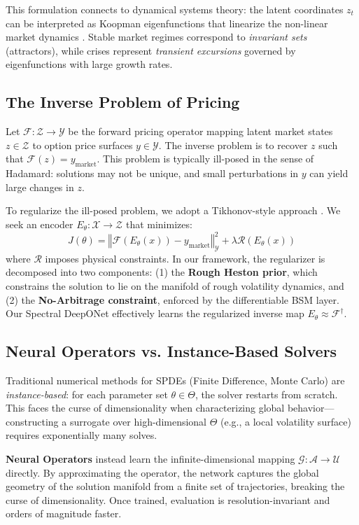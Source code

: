 \documentclass{article}
\newcommand\norm[1]{\left\Vert #1 \right\Vert}
\begin{document}
This formulation connects to dynamical systems theory: the latent coordinates \(z_t\) can be interpreted as Koopman eigenfunctions that linearize the non-linear market dynamics \citep{brunton2021modern}. Stable market regimes correspond to \emph{invariant sets} (attractors), while crises represent \emph{transient excursions} governed by eigenfunctions with large growth rates.

\subsection{The Inverse Problem of Pricing}
Let \(\mathcal{F}: \mathcal{Z} \to \mathcal{Y}\) be the forward pricing operator mapping latent market states \(z \in \mathcal{Z}\) to option price surfaces \(y \in \mathcal{Y}\). The inverse problem is to recover \(z\) such that \(\mathcal{F}(z) = y_{\text{market}}\). This problem is typically ill-posed in the sense of Hadamard: solutions may not be unique, and small perturbations in \(y\) can yield large changes in \(z\).

To regularize the ill-posed problem, we adopt a Tikhonov-style approach \citep{engl1996regularization}. We seek an encoder \(E_\theta: \mathcal{X} \to \mathcal{Z}\) that minimizes:
\[
    J(\theta) = \norm{\mathcal{F}(E_\theta(x)) - y_{\text{market}}}_{\mathcal{Y}}^2 + \lambda \mathcal{R}(E_\theta(x))
\]
where \(\mathcal{R}\) imposes physical constraints. In our framework, the regularizer is decomposed into two components: (1) the \textbf{Rough Heston prior}, which constrains the solution to lie on the manifold of rough volatility dynamics, and (2) the \textbf{No-Arbitrage constraint}, enforced by the differentiable BSM layer. Our Spectral DeepONet effectively learns the regularized inverse map \(E_\theta \approx \mathcal{F}^\dagger\).

\subsection{Neural Operators vs. Instance-Based Solvers}
Traditional numerical methods for SPDEs (Finite Difference, Monte Carlo) are \emph{instance-based}: for each parameter set \(\theta \in \Theta\), the solver restarts from scratch. This faces the curse of dimensionality \citep{Bellman1957} when characterizing global behavior---constructing a surrogate over high-dimensional \(\Theta\) (e.g., a local volatility surface) requires exponentially many solves.

\textbf{Neural Operators} \citep{Lu_2021, kovachki2021neuraloperator} instead learn the infinite-dimensional mapping \(\mathcal{G}: \mathcal{A} \to \mathcal{U}\) directly. By approximating the operator, the network captures the global geometry of the solution manifold from a finite set of trajectories, breaking the curse of dimensionality. Once trained, evaluation is resolution-invariant and orders of magnitude faster.
\end{document}
